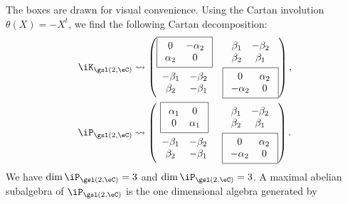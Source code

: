 The boxes are drawn for visual convenience.  Using the Cartan involution $\theta(X)=-X^t$, we find the following Cartan decomposition:
\begin{equation}
	\begin{split}
		\iK_{\gsl(2,\eC)}&\leadsto
		\begin{pmatrix}
			\boxed{
				\begin{array}{cc}
					0        & -\alpha_2 \\
					\alpha_2 & 0
				\end{array}
			}                      &
			\begin{array}{cc}
				\beta_1 & -\beta_2 \\
				\beta_2 & \beta_1
			\end{array}       \\
			\begin{array}{cc}
				-\beta_1 & -\beta_2 \\
				\beta_2  & -\beta_1
			\end{array} &
			\boxed{
				\begin{array}{cc}
					0         & \alpha_2 \\
					-\alpha_2 & 0
				\end{array}
			}
		\end{pmatrix},\\
		\iP_{\gsl(2,\eC)}&\leadsto
		\begin{pmatrix}
			\boxed{
				\begin{array}{cc}
					\alpha_1 & 0        \\
					0        & \alpha_1
				\end{array}
			}                      &
			\begin{array}{cc}
				\beta_1 & -\beta_2 \\
				\beta_2 & \beta_1
			\end{array}       \\
			\begin{array}{cc}
				-\beta_1 & -\beta_2 \\
				\beta_2  & -\beta_1
			\end{array} &
			\boxed{
				\begin{array}{cc}
					0         & \alpha_2 \\
					-\alpha_2 & 0
				\end{array}
			}
		\end{pmatrix}.
	\end{split}
\end{equation}
We have $\dim\iP_{\gsl(2,\eC)}=3$ and $\dim\iP_{\gsl(2,\eC)}=3$. A maximal abelian subalgebra of $\iP_{\gsl(2,\eC)}$ is the one dimensional algebra generated by
